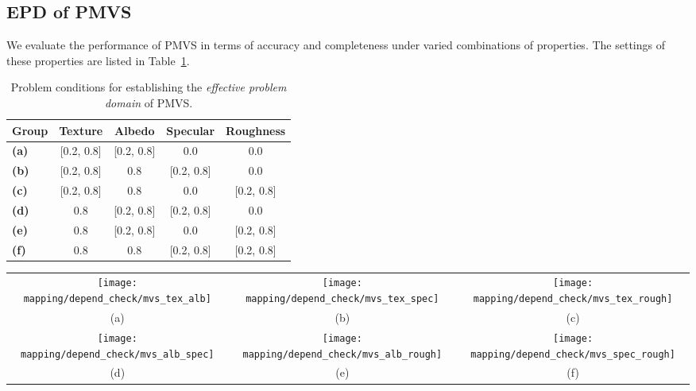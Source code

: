 \subsection{EPD of PMVS}
We evaluate the performance of PMVS in terms of accuracy and completeness under varied combinations of properties. The settings of these properties are listed in Table~\ref{tab:mvs_depend_check_params}.
\begin{table}[!htbp]
  \centering
  \begin{tabular}{l*{4}{c}}
  \hline
  \textbf{Group} & Texture & Albedo & Specular & Roughness\\
  \hline
  \textbf{(a)} & [0.2, 0.8] & [0.2, 0.8] & 0.0 & 0.0\\
  \textbf{(b)} & [0.2, 0.8] & 0.8 & [0.2, 0.8] & 0.0\\
  \textbf{(c)} & [0.2, 0.8] & 0.8 & 0.0 & [0.2, 0.8]\\
  \textbf{(d)} & 0.8 & [0.2, 0.8] & [0.2, 0.8] & 0.0\\
  \textbf{(e)} & 0.8 & [0.2, 0.8] & 0.0 & [0.2, 0.8]\\
  \textbf{(f)} & 0.8 & 0.8 & [0.2, 0.8] & [0.2, 0.8]\\
  \hline
  \end{tabular}
  \caption{Problem conditions for establishing the \textit{effective problem domain} of PMVS.}
  \label{tab:mvs_depend_check_params}
\end{table}

\begin{sidewaysfigure}[!htbp]
\begin{tabular}{ccc}
\texttt{[image: mapping/depend\_check/mvs\_tex\_alb]}&
\texttt{[image: mapping/depend\_check/mvs\_tex\_spec]}&
\texttt{[image: mapping/depend\_check/mvs\_tex\_rough]}\\
(a) & (b) & (c)\\
\texttt{[image: mapping/depend\_check/mvs\_alb\_spec]}&
\texttt{[image: mapping/depend\_check/mvs\_alb\_rough]}&
\texttt{[image: mapping/depend\_check/mvs\_spec\_rough]}\\
(d) & (e) & (f)\\
\end{tabular}
\caption{Performance of PMVS under six pairwise conditions. For instance, (a) shows the performance under changing \textit{texture} and \textit{albedo} values, while the others are fixed. The property values are set based on settings in Table~\ref{tab:mvs_depend_check_params}.}
\label{fig:mvs_depend_check}
\end{sidewaysfigure}

